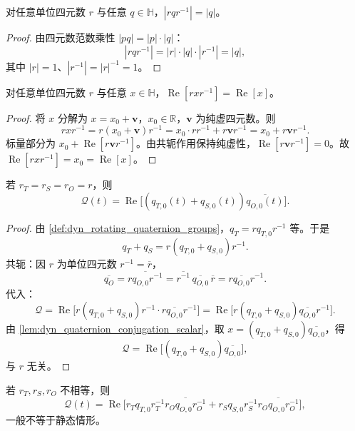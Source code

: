 \begin{proposition}[旋转作用的范数保持]\label{prop:dyn_quaternion_rotation_norm}
对任意单位四元数 $r$ 与任意 $q\in\mathbb H$，$|rqr^{-1}|=|q|$。
\end{proposition}

\begin{proof}
由四元数范数乘性 $|pq|=|p|\cdot|q|$：
\[
|rqr^{-1}|=|r|\cdot|q|\cdot|r^{-1}|=|q|,
\]
其中 $|r|=1$、$|r^{-1}|=|r|^{-1}=1$。
\end{proof}

\begin{lemma}[共轭作用保持标量部分]\label{lem:dyn_quaternion_conjugation_scalar}
对任意单位四元数 $r$ 与任意 $x\in\mathbb H$，$\operatorname{Re}[rxr^{-1}]=\operatorname{Re}[x]$。
\end{lemma}

\begin{proof}
将 $x$ 分解为 $x=x_0+\mathbf v$，$x_0\in\mathbb R$，$\mathbf v$ 为纯虚四元数。则
\[
rxr^{-1}=r(x_0+\mathbf v)r^{-1}=x_0\cdot rr^{-1}+r\mathbf v r^{-1}=x_0+r\mathbf v r^{-1}.
\]
标量部分为 $x_0+\operatorname{Re}[r\mathbf v r^{-1}]$。由共轭作用保持纯虚性，$\operatorname{Re}[r\mathbf v r^{-1}]=0$。故 $\operatorname{Re}[rxr^{-1}]=x_0=\operatorname{Re}[x]$。
\end{proof}

\begin{theorem}[同步旋转下的不变量]\label{thm:dyn_quaternion_sync_invariance}
若 $r_T=r_S=r_O=r$，则
\[
\mathcal Q(t)=\operatorname{Re}\!\big[(q_{T,0}(t)+q_{S,0}(t))\overline{q_{O,0}(t)}\big].
\]
\end{theorem}

\begin{proof}
由 \cref{def:dyn_rotating_quaternion_groups}，$q_T=rq_{T,0}r^{-1}$ 等。于是
\[
q_T+q_S=r(q_{T,0}+q_{S,0})r^{-1}.
\]
共轭：因 $r$ 为单位四元数 $r^{-1}=\overline r$，
\[
\overline{q_O}=\overline{rq_{O,0}r^{-1}}=\overline{r^{-1}}\,\overline{q_{O,0}}\,\overline r=r\overline{q_{O,0}}r^{-1}.
\]
代入：
\[
\mathcal Q=\operatorname{Re}\big[r(q_{T,0}+q_{S,0})r^{-1}\cdot r\overline{q_{O,0}}r^{-1}\big]
=\operatorname{Re}\big[r(q_{T,0}+q_{S,0})\overline{q_{O,0}}r^{-1}\big].
\]
由 \cref{lem:dyn_quaternion_conjugation_scalar}，取 $x=(q_{T,0}+q_{S,0})\overline{q_{O,0}}$，得
\[
\mathcal Q=\operatorname{Re}\big[(q_{T,0}+q_{S,0})\overline{q_{O,0}}\big],
\]
与 $r$ 无关。
\end{proof}

\begin{corollary}[异步旋转的非平凡性]\label{cor:dyn_quaternion_async}
若 $r_T,r_S,r_O$ 不相等，则
\[
\mathcal Q(t)=\operatorname{Re}\!\big[r_T q_{T,0}r_T^{-1}\overline{r_O q_{O,0}r_O^{-1}}+r_S q_{S,0}r_S^{-1}\overline{r_O q_{O,0}r_O^{-1}}\big],
\]
一般不等于静态情形。
\end{corollary}

